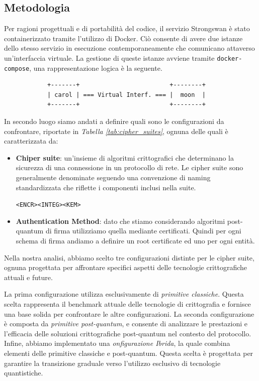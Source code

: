 \subsection{Metodologia}

Per ragioni progettuali e di portabilità del codice, il servizio Strongswan è stato 
containerizzato tramite l'utilizzo di Docker. Ciò consente di avere due istanze dello stesso
servizio in esecuzione contemporaneamente che comunicano attaverso un'interfaccia virtuale. 
La gestione di queste istanze avviene tramite \texttt{docker-compose}, una rappresentazione
logica è la seguente.

\begin{center}
    \begin{verbatim}
            +-------+                         +--------+ 
            | carol | === Virtual Interf. === |  moon  |
            +-------+                         +--------+ 
    \end{verbatim}
\end{center}

\noindent
In secondo luogo siamo andati a definire quali sono le configurazioni da confrontare, riportate in 
\textit{Tabella \ref{tab:cipher_suites}}, ognuna delle quali è caratterizzata da:

\begin{itemize}
    \item \textbf{Chiper suite}: un'insieme di algoritmi crittografici che determinano la sicurezza di una connessione in un protocollo di rete.
    Le cipher suite sono generalmente denominate seguendo una convenzione di naming standardizzata che riflette i componenti inclusi nella suite.
    \begin{center}
        \texttt{<ENCR>\text{-}<INTEG>\text{-}<KEM>}
    \end{center}

    \item \textbf{Authentication Method}: dato che stiamo considerando algoritmi post-quantum di firma
    utilizziamo quella mediante certificati. Quindi per ogni schema di firma andiamo a definire un root certificate
    ed uno per ogni entità.
\end{itemize}

\noindent
Nella nostra analisi, abbiamo scelto tre configurazioni distinte per le cipher
suite, ognuna progettata per affrontare specifici aspetti delle tecnologie
critto\-grafiche attuali e future.

\noindent
La prima configurazione utilizza esclusivamente di \textit{primitive classiche}. 
Questa scelta rappresenta il benchmark attuale delle tecnologie di crittografia e fornisce una base
solida per confrontare le altre configurazioni. La seconda
configurazione è composta da \textit{primitive post-quantum}, e consente di
analizzare le prestazioni e l'efficacia delle soluzioni crittografiche
post-quantum nel contesto del protocollo. Infine, abbiamo implementato
una \textit{onfigurazione Ibrida}, la quale combina elementi delle primitive
classiche e post-quantum. Questa scelta è progettata per garantire la transizione 
graduale verso l'utilizzo esclusivo di tecnologie quantistiche.

